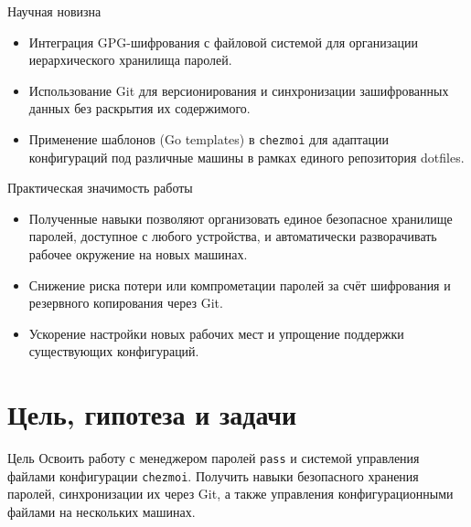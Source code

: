 \documentclass[
  ignorenonframetext,
  aspectratio=169,
  russian,
  aspectratio=169]{beamer}
\providecommand{\tightlist}{%
  \setlength{\itemsep}{0pt}\setlength{\parskip}{0pt}}
\begin{document}
\begin{frame}[fragile]{Научная новизна}
\protect{}\label{ux43dux430ux443ux447ux43dux430ux44f-ux43dux43eux432ux438ux437ux43dux430}
\begin{itemize}[<+->]
\tightlist
\item
  Интеграция GPG-шифрования с файловой системой для организации
  иерархического хранилища паролей.
\item
  Использование Git для версионирования и синхронизации зашифрованных
  данных без раскрытия их содержимого.
\item
  Применение шаблонов (Go templates) в \texttt{chezmoi} для адаптации
  конфигураций под различные машины в рамках единого репозитория
  dotfiles.
\end{itemize}
\end{frame}

\begin{frame}{Практическая значимость работы}
\protect{}\label{ux43fux440ux430ux43aux442ux438ux447ux435ux441ux43aux430ux44f-ux437ux43dux430ux447ux438ux43cux43eux441ux442ux44c-ux440ux430ux431ux43eux442ux44b}
\begin{itemize}[<+->]
\tightlist
\item
  Полученные навыки позволяют организовать единое безопасное хранилище
  паролей, доступное с любого устройства, и автоматически разворачивать
  рабочее окружение на новых машинах.
\item
  Снижение риска потери или компрометации паролей за счёт шифрования и
  резервного копирования через Git.
\item
  Ускорение настройки новых рабочих мест и упрощение поддержки
  существующих конфигураций.
\end{itemize}
\end{frame}

\section{Цель, гипотеза и
задачи}\label{ux446ux435ux43bux44c-ux433ux438ux43fux43eux442ux435ux437ux430-ux438-ux437ux430ux434ux430ux447ux438}

\begin{frame}[fragile]{Цель}
\protect{}\label{ux446ux435ux43bux44c}
Освоить работу с менеджером паролей \texttt{pass} и системой управления
файлами конфигурации \texttt{chezmoi}. Получить навыки безопасного
хранения паролей, синхронизации их через Git, а также управления
конфигурационными файлами на нескольких машинах.
\end{frame}
\end{document}
